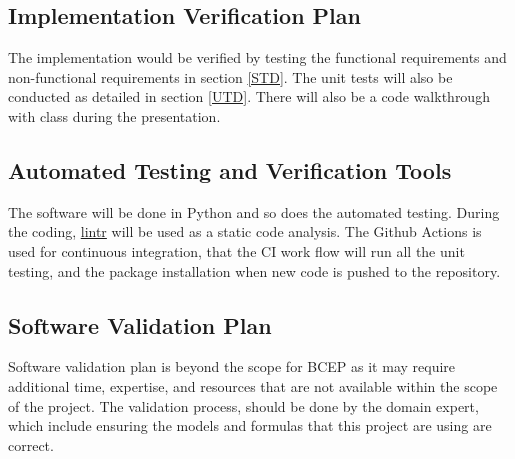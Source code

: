 \documentclass[12pt, titlepage]{article}
\begin{document}


\subsection{Implementation Verification Plan}\label{IVP}
The implementation would be verified by testing the functional requirements and non-functional requirements in section \ref{STD}. The unit tests will also be conducted as detailed in section \ref{UTD}. There will also be a code walkthrough with class during the presentation.


\subsection{Automated Testing and Verification Tools}\label{ATVT}
The software will be done in Python and so does the automated testing. During the coding, \href{https://lintr.r-lib.org/}{lintr} will be used as a static code analysis. The Github Actions is used for continuous integration, that the CI work flow will run all the unit testing, and the package installation when new code is pushed to the repository. 



\subsection{Software Validation Plan}\label{SVP}
Software validation plan is beyond the scope for BCEP as it may require additional time, expertise, and resources that are not available within the scope of the project. The validation process, should be done by the domain expert, which include ensuring the models and formulas that this project are using are correct.
\end{document}
